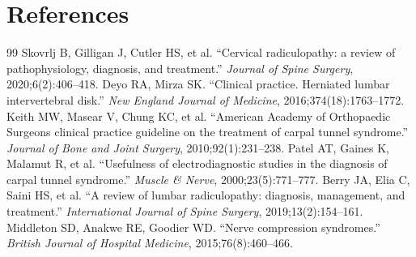 \section*{References}
\begin{thebibliography}{99}
 Skovrlj B, Gilligan J, Cutler HS, et al. ``Cervical radiculopathy: a review of pathophysiology, diagnosis, and treatment.'' \textit{Journal of Spine Surgery}, 2020;6(2):406--418.
 Deyo RA, Mirza SK. ``Clinical practice. Herniated lumbar intervertebral disk.'' \textit{New England Journal of Medicine}, 2016;374(18):1763--1772.
 Keith MW, Masear V, Chung KC, et al. ``American Academy of Orthopaedic Surgeons clinical practice guideline on the treatment of carpal tunnel syndrome.'' \textit{Journal of Bone and Joint Surgery}, 2010;92(1):231--238.
 Patel AT, Gaines K, Malamut R, et al. ``Usefulness of electrodiagnostic studies in the diagnosis of carpal tunnel syndrome.'' \textit{Muscle \& Nerve}, 2000;23(5):771--777.
 Berry JA, Elia C, Saini HS, et al. ``A review of lumbar radiculopathy: diagnosis, management, and treatment.'' \textit{International Journal of Spine Surgery}, 2019;13(2):154--161.
 Middleton SD, Anakwe RE, Goodier WD. ``Nerve compression syndromes.'' \textit{British Journal of Hospital Medicine}, 2015;76(8):460--466.

\end{thebibliography}
